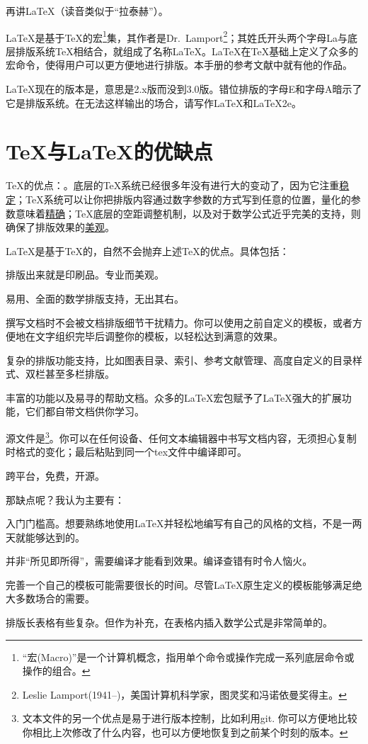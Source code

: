 再讲\LaTeX （读音类似于“拉泰赫”）。

\LaTeX 是基于\TeX 的宏\footnote{“宏(Macro)”是一个计算机概念，指用单个命令或操作完成一系列底层命令或操作的组合。}集，其作者是Dr.~Lamport\footnote{Leslie Lamport(1941--)，美国计算机科学家，图灵奖和冯诺依曼奖得主。}；其姓氏开头两个字母La与底层排版系统\TeX 相结合，就组成了名称\LaTeX 。\LaTeX 在\TeX 基础上定义了众多的宏命令，使得用户可以更方便地进行排版。本手册的参考文献中就有他的作品。

\LaTeX 现在的版本是\LaTeXe ，意思是2.x版而没到3.0版。错位排版的字母E和字母A暗示了它是排版系统。在无法这样输出的场合，请写作LaTeX和LaTeX2e。

\section{\TeX 与\LaTeX 的优缺点}
\TeX 的优点：。底层的\TeX 系统已经很多年没有进行大的变动了，因为它注重\uline{稳定}；\TeX 系统可以让你把排版内容通过数字参数的方式写到任意的位置，量化的参数意味着\uline{精确}；\TeX 底层的空距调整机制，以及对于数学公式近乎完美的支持，则确保了排版效果的\uline{美观}。

\LaTeX 是基于\TeX 的，自然不会抛弃上述\TeX 的优点。具体包括：
\begin{feai}
\item 排版出来就是印刷品。专业而美观。
\item 易用、全面的数学排版支持，无出其右。
\item 撰写文档时不会被文档排版细节干扰精力。你可以使用之前自定义的模板，或者方便地在文字组织完毕后调整你的模板，以轻松达到满意的效果。
\item 复杂的排版功能支持，比如图表目录、索引、参考文献管理、高度自定义的目录样式、双栏甚至多栏排版。
\item 丰富的功能以及易寻的帮助文档。众多的\LaTeX 宏包赋予了\LaTeX 强大的扩展功能，它们都自带文档供你学习。
\item 源文件是\footnote{文本文件的另一个优点是易于进行版本控制，比如利用git. 你可以方便地比较你相比上次修改了什么内容，也可以方便地恢复到之前某个时刻的版本。}。你可以在任何设备、任何文本编辑器中书写文档内容，无须担心复制时格式的变化；最后粘贴到同一个tex文件中编译即可。
\item 跨平台，免费，开源。
\end{feai}

那缺点呢？我认为主要有：
\begin{feai}
\item 入门门槛高。想要熟练地使用\LaTeX 并轻松地编写有自己的风格的文档，不是一两天就能够达到的。
\item 并非“所见即所得”，需要编译才能看到效果。编译查错有时令人恼火。
\item 完善一个自己的模板可能需要很长的时间。尽管\LaTeX 原生定义的模板能够满足绝大多数场合的需要。
\item 排版长表格有些复杂。但作为补充，在表格内插入数学公式是非常简单的。
\end{feai}

